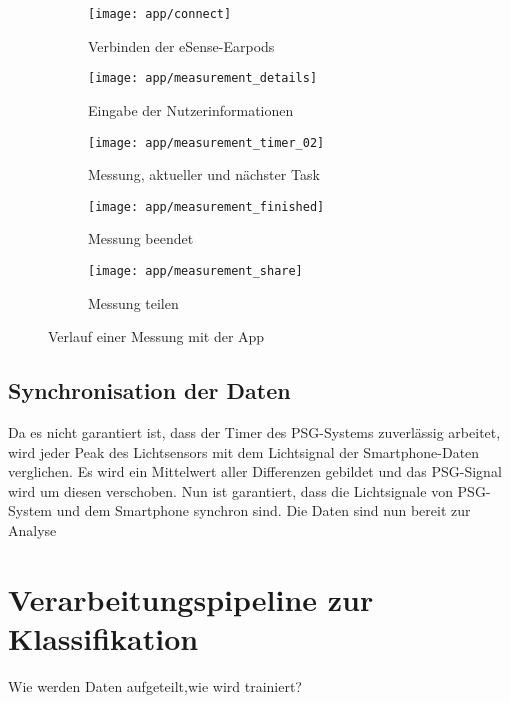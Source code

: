 \begin{figure}[ht]
  \centering
  \begin{subfigure}{.25\textwidth}
    \texttt{[image: app/connect]}
    \caption{Verbinden der eSense-Earpods}
    \label{implementation:app:screenshots:connect_bluetooth}
  \end{subfigure}
  \begin{subfigure}{.25\textwidth}
    \texttt{[image: app/measurement\_details]}
    \caption{Eingabe der Nutzerinformationen}
    \label{implementation:app:screenshots:user_studies_information}
  \end{subfigure}
  \begin{subfigure}{.25\textwidth}
    \texttt{[image: app/measurement\_timer\_02]}
    \caption{Messung, aktueller und nächster Task}
    \label{implementation:app:screenshots:measurement_started}
  \end{subfigure}
  \begin{subfigure}{.25\textwidth}
    \texttt{[image: app/measurement\_finished]}
    \caption{Messung beendet}
    \label{implementation:app:screenshots:sampling_stopped}
  \end{subfigure}
  \begin{subfigure}{.25\textwidth}
    \texttt{[image: app/measurement\_share]}
    \caption{Messung teilen}
    \label{implementation:app:screenshots:share}
  \end{subfigure}
  \caption{Verlauf einer Messung mit der App}
  \label{implementation:app:screenshots}
\end{figure}

\subsection{Synchronisation der Daten}
Da es nicht garantiert ist, dass der Timer des PSG-Systems zuverlässig arbeitet, wird jeder Peak des Lichtsensors mit dem Lichtsignal der Smartphone-Daten verglichen.
Es wird ein Mittelwert aller Differenzen gebildet und das PSG-Signal wird um diesen verschoben.
Nun ist garantiert, dass die Lichtsignale von PSG-System und dem Smartphone synchron sind. Die Daten sind nun bereit zur Analyse

\section{Verarbeitungspipeline zur Klassifikation}
Wie werden Daten aufgeteilt,wie wird trainiert?
